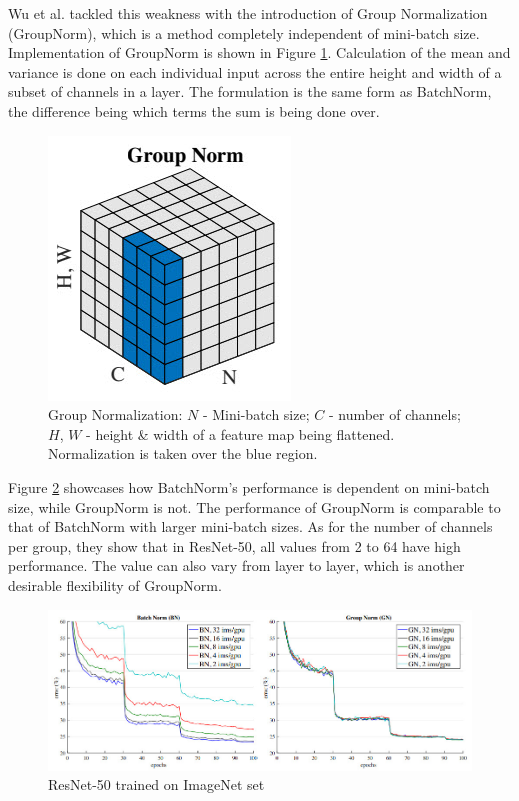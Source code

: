 \documentclass{article}
\begin{document}
Wu et al. \cite{groupnorm} tackled this weakness with the introduction of Group Normalization (GroupNorm), which is a method completely independent of mini-batch size. Implementation of GroupNorm is shown in Figure \ref{fig:groupnorm}. Calculation of the mean and variance is done on each individual input across the entire height and width of a subset of channels in a layer. The formulation is the same form as BatchNorm, the difference being which terms the sum is being done over.

\begin{figure}[h]
	\centering
    \includegraphics[scale=0.7]{pics/batchNorm/GroupNorm.jpg}
	\caption{Group Normalization: $N$ - Mini-batch size; $C$ - number of channels; $H$, $W$ - height \& width of a feature map being flattened. Normalization is taken over the blue region.}
	\label{fig:groupnorm}
\end{figure}

Figure \ref{fig:resnet} showcases how BatchNorm's performance is dependent on mini-batch size, while GroupNorm is not. The performance of GroupNorm is comparable to that of BatchNorm with larger mini-batch sizes. As for the number of channels per group, they show that in ResNet-50, all values from 2 to 64 have high performance. The value can also vary from layer to layer, which is another desirable flexibility of GroupNorm.

\begin{figure}[h]
	\centering
    \includegraphics[scale=0.57]{pics/batchNorm/GroupNorm_vs_BatchNorm.jpg}
	\caption{ResNet-50 trained on ImageNet set}
	\label{fig:resnet}
\end{figure}
\end{document}
